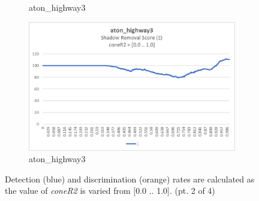 \begin{appendices}
\begin{figure}
\begin{subfigure}{.45\linewidth}
  \caption{aton\_highway3}
\end{subfigure}
\hfill
\begin{subfigure}{.45\linewidth}
  \includegraphics[width=1\linewidth]{figures/appendix/highway3_coneR2_score.jpg}
  \caption{aton\_highway3}
\end{subfigure}
\caption{Detection (blue) and discrimination (orange) rates are calculated as the value of \textit{coneR2} is varied from [0.0 .. 1.0]. (pt. 2 of 4)}

\end{figure}

\begin{figure}


\end{figure}
\end{appendices}

